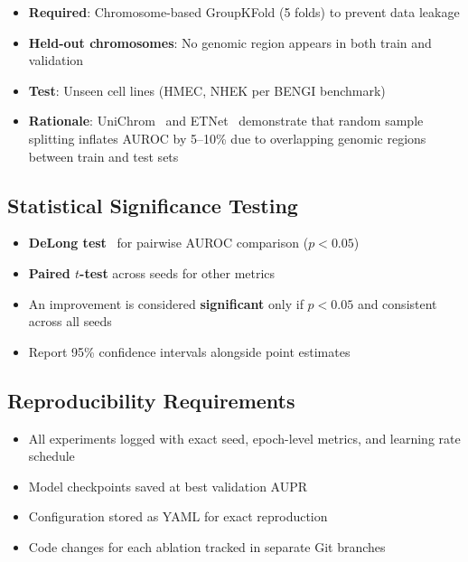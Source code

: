 \documentclass[11pt,a4paper]{article}
\begin{document}
\begin{itemize}
    \item \textbf{Required}: Chromosome-based GroupKFold (5 folds) to prevent data leakage
    \item \textbf{Held-out chromosomes}: No genomic region appears in both train and validation
    \item \textbf{Test}: Unseen cell lines (HMEC, NHEK per BENGI benchmark)
    \item \textbf{Rationale}: UniChrom~\cite{unichrom} and ETNet~\cite{etnet} demonstrate that random sample splitting inflates AUROC by 5--10\% due to overlapping genomic regions between train and test sets
\end{itemize}

\subsection{Statistical Significance Testing}

\begin{itemize}
    \item \textbf{DeLong test}~\cite{etnet} for pairwise AUROC comparison ($p < 0.05$)
    \item \textbf{Paired $t$-test} across seeds for other metrics
    \item An improvement is considered \textbf{significant} only if $p < 0.05$ and consistent across all seeds
    \item Report 95\% confidence intervals alongside point estimates
\end{itemize}

\subsection{Reproducibility Requirements}

\begin{itemize}
    \item All experiments logged with exact seed, epoch-level metrics, and learning rate schedule
    \item Model checkpoints saved at best validation AUPR
    \item Configuration stored as YAML for exact reproduction
    \item Code changes for each ablation tracked in separate Git branches
\end{itemize}

\end{document}
